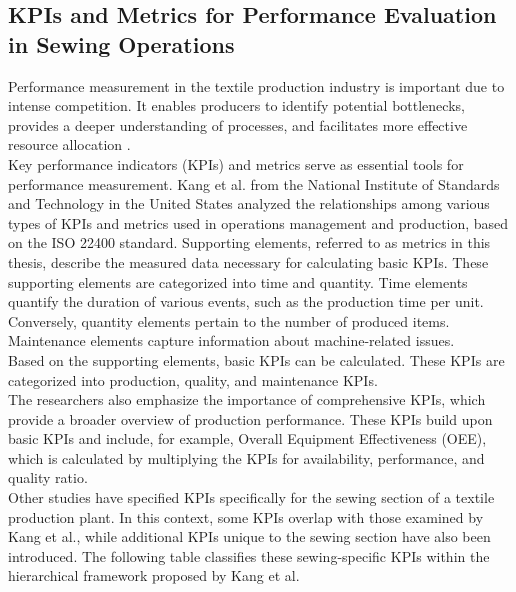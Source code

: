 \subsection{KPIs and Metrics for Performance Evaluation in Sewing Operations}
Performance measurement in the textile production industry is important due to intense competition. It enables producers to identify potential bottlenecks, provides a deeper understanding of processes, and facilitates more effective resource allocation \cite{alauddinProcessImprovementSewing2018}.
\\Key performance indicators (KPIs) and metrics serve as essential tools for performance measurement. Kang et al. \cite{kangHierarchicalStructureKey2016} from the National Institute of Standards and Technology in the United States analyzed the relationships among various types of KPIs and metrics used in operations management and production, based on the ISO 22400 standard.
Supporting elements, referred to as metrics in this thesis, describe the measured data necessary for calculating basic KPIs. These supporting elements are categorized into time and quantity.
Time elements quantify the duration of various events, such as the production time per unit. Conversely, quantity elements pertain to the number of produced items.
Maintenance elements capture information about machine-related issues. 
\\Based on the supporting elements, basic KPIs can be calculated. These KPIs are categorized into production, quality, and maintenance KPIs.
\\The researchers also emphasize the importance of comprehensive KPIs, which provide a broader overview of production performance. These KPIs build upon basic KPIs and include, for example, Overall Equipment Effectiveness (OEE), which is calculated by multiplying the KPIs for availability, performance, and quality ratio.
\\Other studies \cite{kironKPIKeyPerformance2022, alauddinProcessImprovementSewing2018} have specified KPIs specifically for the sewing section of a textile production plant. In this context, some KPIs overlap with those examined by Kang et al., while additional KPIs unique to the sewing section have also been introduced. The following table classifies these sewing-specific KPIs within the hierarchical framework proposed by Kang et al.

